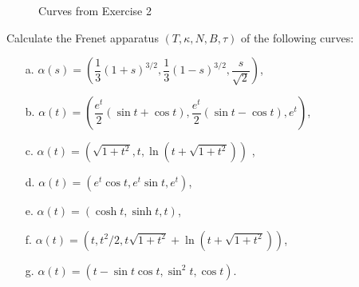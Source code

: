 \documentclass[Shifrin_Solutions_Spring_2018]{subfiles}
\begin{document}
\begin{figure}[h]
\centering
{}
\caption{Curves from Exercise 2}
\end{figure}

\vfill
\pagebreak


\begin{exercise}
Calculate the Frenet apparatus $(T,\kappa, N, B, \tau)$ of the following curves:
\begin{itemize}
\item[a.] $\alpha(s) = \left( \dfrac{1}{3}(1 + s)^{3/2}, \dfrac{1}{3} (1-s)^{3/2} , 
\dfrac{s}{\sqrt{2}} \right) $,
\item[b.] $\alpha(t) = \left( \dfrac{ e^t}{2} (\sin t + \cos t) ,  
\dfrac{ e^t}{2} (\sin t - \cos t) , e^t \right) $,
\item[c.] $ \alpha(t) = ( \sqrt{1 + t^2} , t , \ln(t + \sqrt{1+t^2}) )$ ,
\item[d.] $\alpha(t) = ( e^t \cos t , e^t \sin t, e^t )$,
\item[e.] $\alpha(t) = (\cosh t, \sinh t, t )$,
\item[f.] $ \alpha(t) = (t , t^2/2 , t\sqrt{1+t^2} + \ln( t + \sqrt{1+t^2})  )$,
\item[g.] $ \alpha(t) = (t - \sin t \cos t , \sin^2 t , \cos t ) $.
\end{itemize}
\end{exercise}
\end{document}
